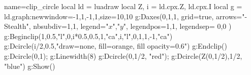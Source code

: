 \documentclass{standalone}%
\begin{document}
\begin{luadraw}{name=clip_circle}
local ld = luadraw
local Z, i = ld.cpx.Z, ld.cpx.I
local g = ld.graph:new{window={-1,1,-1,1},size={10,10}}
g:Daxes({0,1,1}, {grid=true, arrows="-Stealth", nbsubdiv={1,1}, legend={"$x$","$y$"},
    legendpos={1,1}, legendsep= {0,0} })
g:Beginclip({1,0.5,"l",0,i*0.5,0.5,1,"ca",i,"l",0,1,1,-1,"ca"})
    g:Dcircle(i/2,0.5,"draw=none, fill=orange, fill opacity=0.6")
g:Endclip()
g:Dcircle(0,1); g:Linewidth(8)
g:Dcircle(0,1/2, "red"); g:Dcircle(Z(0,1/2),1/2, "blue")
g:Show()
\end{luadraw}
\end{document}
